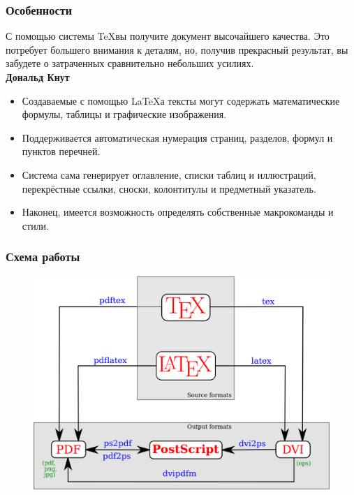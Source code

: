 \documentclass[default]{beamer}
\begin{document}
	\begin{frame}
		\frametitle{Особенности}
		\begin{displayquote}
			С помощью системы \TeX вы получите документ высочайшего качества. Это потребует большего внимания к деталям, но, получив прекрасный результат, вы забудете о затраченных сравнительно небольших усилиях.\\
			\textbf{Дональд Кнут}
		\end{displayquote}
		\par\bigskip
		\begin{itemize}
			\item Создаваемые с помощью \LaTeX а тексты могут содержать математические формулы,
			таблицы и графические изображения. 
			\item Поддерживается автоматическая нумерация страниц, разделов, формул и пунктов перечней. 
			\item Система сама генерирует оглавление, списки таблиц и иллюстраций, перекрёстные ссылки, сноски, колонтитулы и предметный указатель. 
			\item Наконец, имеется возможность определять собственные макрокоманды и стили.
		\end{itemize}

	\end{frame}

	\begin{frame}
		\frametitle{Схема работы}
		\begin{figure}
			\includegraphics[width=\textheight]{latex_diagram.png}
		\end{figure}
	\end{frame}
\end{document}
